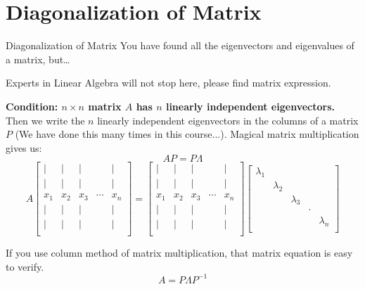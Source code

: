 \documentclass{beamer}
\begin{document}
        \section{Diagonalization of Matrix}
        \begin{frame}{Diagonalization of Matrix}
        You have found all the eigenvectors and eigenvalues of a matrix, but\dots
        
        \vspace{3pt}
        Experts in Linear Algebra will not stop here, please find matrix expression.
        
        \vspace{3pt}
        \textbf{Condition: $n\times n$ matrix $A$ has $n$ linearly independent eigenvectors.} Then we write the $n$ linearly independent eigenvectors in the columns of a matrix $P$ (We have done this many times in this course...). Magical matrix multiplication gives us:
        \begin{equation*}
            AP=P\varLambda
        \end{equation*}
        \begin{equation*}
            A\left[ \begin{matrix}
                |&		|&		|&		&		|\\
                |&		|&		|&		&		|\\
                x_1&		x_2&		x_3&		\cdots&		x_n\\
                |&		|&		|&		&		|\\
                |&		|&		|&		&		|\\
            \end{matrix} \right] =\left[ \begin{matrix}
                |&		|&		|&		&		|\\
                |&		|&		|&		&		|\\
                x_1&		x_2&		x_3&		\cdots&		x_n\\
                |&		|&		|&		&		|\\
                |&		|&		|&		&		|\\
            \end{matrix} \right] \left[ \begin{matrix}
                \lambda _1&		&		&		&		\\
                &		\lambda _2&		&		&		\\
                &		&		\lambda _3&		&		\\
                &		&		&		\cdot&		\\
                &		&		&		&		\lambda _n\\
            \end{matrix} \right]
        \end{equation*}
        
        If you use column method of matrix multiplication, that matrix equation is easy to verify.
        \begin{equation*}
            A=P\varLambda P^{-1}
        \end{equation*}
        \end{frame}
        
\end{document}
